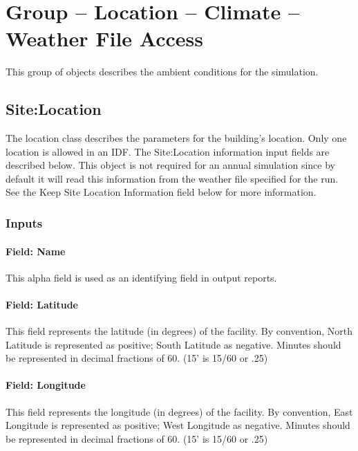 \section{Group -- Location -- Climate -- Weather File Access}\label{group-location-climate-weather-file-access}

This group of objects describes the ambient conditions for the simulation.

\subsection{Site:Location}\label{sitelocation}

The location class describes the parameters for the building's location. Only one location is allowed in an IDF. The Site:Location information input fields are described below.  This object is not required for an annual simulation since by default it will read this information from the weather file specified for the run.  See the Keep Site Location Information field below for more information.

\subsubsection{Inputs}\label{inputs-201709281625}

\paragraph{Field: Name}\label{field-name-201709281626}

This alpha field is used as an identifying field in output reports.

\paragraph{Field: Latitude}\label{field-latitude}

This field represents the latitude (in degrees) of the facility. By convention, North Latitude is represented as positive; South Latitude as negative. Minutes should be represented in decimal fractions of 60. (15' is 15/60 or .25)

\paragraph{Field: Longitude}\label{field-longitude}

This field represents the longitude (in degrees) of the facility. By convention, East Longitude is represented as positive; West Longitude as negative. Minutes should be represented in decimal fractions of 60. (15' is 15/60 or .25)

